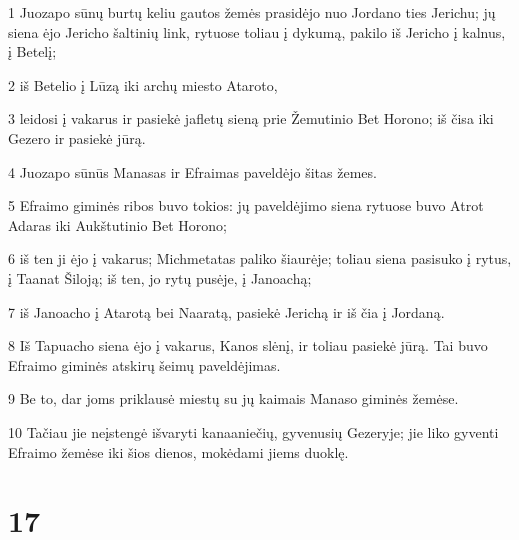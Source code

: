 \par 1 Juozapo sūnų burtų keliu gautos žemės prasidėjo nuo Jordano ties Jerichu; jų siena ėjo Jericho šaltinių link, rytuose toliau į dykumą, pakilo iš Jericho į kalnus, į Betelį; 
\par 2 iš Betelio į Lūzą iki archų miesto Ataroto, 
\par 3 leidosi į vakarus ir pasiekė jafletų sieną prie Žemutinio Bet Horono; iš čisa iki Gezero ir pasiekė jūrą. 
\par 4 Juozapo sūnūs Manasas ir Efraimas paveldėjo šitas žemes. 
\par 5 Efraimo giminės ribos buvo tokios: jų paveldėjimo siena rytuose buvo Atrot Adaras iki Aukštutinio Bet Horono; 
\par 6 iš ten ji ėjo į vakarus; Michmetatas paliko šiaurėje; toliau siena pasisuko į rytus, į Taanat Šiloją; iš ten, jo rytų pusėje, į Janoachą; 
\par 7 iš Janoacho į Atarotą bei Naaratą, pasiekė Jerichą ir iš čia į Jordaną. 
\par 8 Iš Tapuacho siena ėjo į vakarus, Kanos slėnį, ir toliau pasiekė jūrą. Tai buvo Efraimo giminės atskirų šeimų paveldėjimas. 
\par 9 Be to, dar joms priklausė miestų su jų kaimais Manaso giminės žemėse. 
\par 10 Tačiau jie neįstengė išvaryti kanaaniečių, gyvenusių Gezeryje; jie liko gyventi Efraimo žemėse iki šios dienos, mokėdami jiems duoklę.



\chapter{17}



